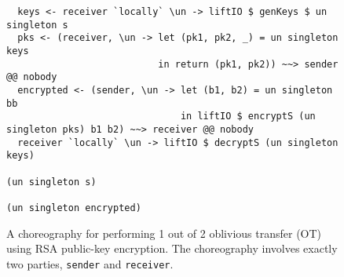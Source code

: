 \documentclass[sigplan,screen]{acmart}
\newcommand{\inlinecode}[2][haskell]{\texttt{#2}}
\begin{document}
\begin{figure*}
\begin{mdframed}
\begin{verbatim}
  keys <- receiver `locally` \un -> liftIO $ genKeys $ un singleton s
  pks <- (receiver, \un -> let (pk1, pk2, _) = un singleton keys
                           in return (pk1, pk2)) ~~> sender @@ nobody
  encrypted <- (sender, \un -> let (b1, b2) = un singleton bb
                               in liftIO $ encryptS (un singleton pks) b1 b2) ~~> receiver @@ nobody
  receiver `locally` \un -> liftIO $ decryptS (un singleton keys)
                                                           (un singleton s)
                                                           (un singleton encrypted)
\end{verbatim}
\caption{A choreography for performing 1 out of 2 oblivious transfer (OT) using RSA public-key encryption. The choreography involves exactly two parties, \inlinecode{sender} and \inlinecode{receiver}.}
\label{fig:oblivious-transfer}
\end{mdframed}
\end{figure*}
\end{document}
